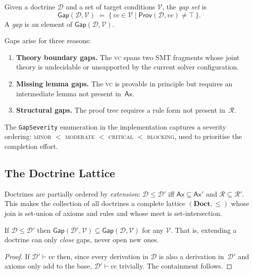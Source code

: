\documentclass[11pt]{article}
\newcommand{\Doct}{\mathcal{D}}           %
\newcommand{\Ax}{\mathsf{Ax}}             %
\newcommand{\Rules}{\mathcal{R}}          %
\newcommand{\Prov}{\mathsf{Prov}}         %
\newcommand{\Gap}{\mathsf{Gap}}           %
\newcommand{\VC}{\mathit{vc}}             %
\newcommand{\VCset}{\mathcal{V}}          %
\begin{document}
\begin{definition}[Gap]\label{def:gap}
Given a doctrine $\Doct$ and a set of target conditions $\VCset$, the
\emph{gap set} is
\[
  \Gap(\Doct, \VCset)
    \;=\; \{\,\VC \in \VCset \mid \Prov(\Doct, \VC) \neq \top\,\}.
\]
A \emph{gap} is an element of $\Gap(\Doct, \VCset)$.
\end{definition}

Gaps arise for three reasons:

\begin{enumerate}[leftmargin=2em,label=(\alph*)]
  \item \textbf{Theory boundary gaps.}  The \textsc{vc} spans two SMT
        fragments whose joint theory is undecidable or unsupported by
        the current solver configuration.
  \item \textbf{Missing lemma gaps.}  The \textsc{vc} is provable in
        principle but requires an intermediate lemma not present in~$\Ax$.
  \item \textbf{Structural gaps.}  The proof tree requires a rule form
        not present in~$\Rules$.
\end{enumerate}

The \texttt{GapSeverity} enumeration in the implementation captures a
severity ordering: \textsc{minor} $<$ \textsc{moderate} $<$
\textsc{critical} $<$ \textsc{blocking}, used to prioritise the
completion effort.

\subsection{The Doctrine Lattice}

Doctrines are partially ordered by \emph{extension}: $\Doct \leq \Doct'$
iff $\Ax \subseteq \Ax'$ and $\Rules \subseteq \Rules'$.  This makes
the collection of all doctrines a complete lattice
$(\mathbf{Doct}, \leq)$ whose join is set-union of axioms and rules and
whose meet is set-intersection.

\begin{proposition}[Monotonicity]\label{prop:monotone}
If $\Doct \leq \Doct'$ then $\Gap(\Doct', \VCset) \subseteq \Gap(\Doct, \VCset)$
for any $\VCset$.  That is, extending a doctrine can only
\emph{close} gaps, never open new ones.
\end{proposition}
\begin{proof}
If $\Doct' \vdash \VC$ then, since every derivation in $\Doct$ is also
a derivation in~$\Doct'$ and axioms only add to the base, $\Doct' \vdash \VC$
trivially.  The containment follows.
\end{proof}
\end{document}
